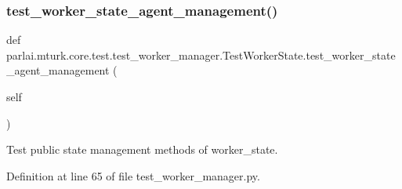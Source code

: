 \subsubsection{\texorpdfstring{test\+\_\+worker\+\_\+state\+\_\+agent\+\_\+management()}{test\_worker\_state\_agent\_management()}}
{\footnotesize\ttfamily def parlai.\+mturk.\+core.\+test.\+test\+\_\+worker\+\_\+manager.\+Test\+Worker\+State.\+test\+\_\+worker\+\_\+state\+\_\+agent\+\_\+management (\begin{DoxyParamCaption}\item[{}]{self }\end{DoxyParamCaption})}

\begin{DoxyVerb}Test public state management methods of worker_state.
\end{DoxyVerb}
 

Definition at line 65 of file test\+\_\+worker\+\_\+manager.\+py.


